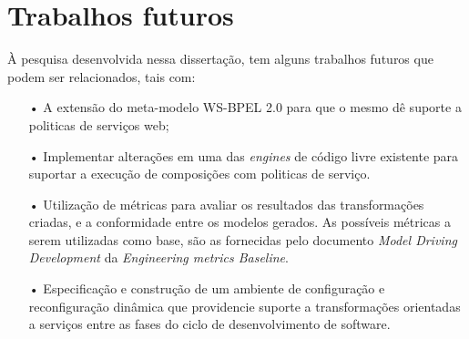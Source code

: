 \section{Trabalhos futuros}
\label{perspectives}

À pesquisa desenvolvida nessa dissertação, tem alguns trabalhos futuros que podem ser relacionados, tais com:

\begin{itemize}

\item[•] A extensão do meta-modelo  WS-BPEL 2.0 para que o mesmo dê suporte a politicas de serviços web;

\item[•] Implementar alterações em uma das \textit{engines} de código livre existente para suportar a execução de composições com politicas de serviço.


\item[•] Utilização de métricas para avaliar os resultados das transformações criadas, e a conformidade entre os modelos gerados. As possíveis métricas a serem utilizadas como base, são as fornecidas pelo documento \textit{Model Driving Development} da  \textit{Engineering metrics Baseline}.


\item[•] Especificação e construção de um ambiente de configuração e reconfiguração dinâmica que providencie suporte a transformações orientadas a serviços entre as fases do ciclo de desenvolvimento de software.

\end{itemize}



